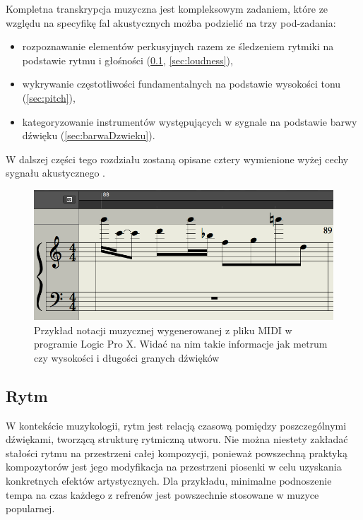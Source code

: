 \documentclass[12pt,a4paper,twoside]{mwart}
\begin{document}
Kompletna transkrypcja muzyczna jest kompleksowym zadaniem, które ze względu na specyfikę fal akustycznych możba podzielić na trzy pod-zadania:
\begin{itemize}
  \item rozpoznawanie elementów perkusyjnych razem ze śledzeniem rytmiki na podstawie rytmu i głośności (\ref{sec:rytm}, \ref{sec:loudness}),
  \item wykrywanie częstotliwości fundamentalnych na podstawie wysokości tonu (\ref{sec:pitch}),
  \item  kategoryzowanie instrumentów występujących w sygnale na podstawie barwy dźwięku (\ref{sec:barwaDzwieku}).
\end{itemize}
W dalszej części tego rozdziału zostaną opisane cztery wymienione wyżej cechy sygnału akustycznego \cite[63]{Homerecording:DlaKazdego}.
\begin{figure}[h]
  \begin{center}
    \includegraphics[scale=0.5]{images/pieciolinia_logic.png}
    \caption{Przykład notacji muzycznej wygenerowanej z pliku MIDI w programie Logic Pro X. Widać na nim takie informacje jak metrum czy wysokości i długości granych dźwięków}
  \end{center}
\end{figure}




\subsection{Rytm} \label{sec:rytm}
W kontekście muzykologii, rytm jest relacją czasową pomiędzy poszczególnymi dźwiękami, tworzącą strukturę rytmiczną utworu. Nie można niestety zakładać stałości rytmu na przestrzeni całej kompozycji, ponieważ powszechną praktyką kompozytorów jest jego modyfikacja na przestrzeni piosenki w celu uzyskania konkretnych efektów artystycznych. Dla przykładu, minimalne podnoszenie tempa na czas każdego z refrenów jest powszechnie stosowane w muzyce popularnej.
\end{document}
